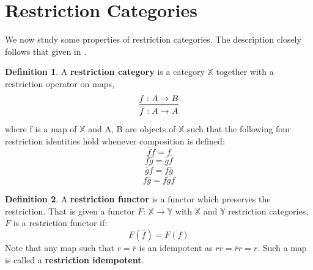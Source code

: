\documentclass[11pt, oneside]{amsart}
\theoremstyle{definition}
\newtheorem{definition}{Definition}[section]
\theoremstyle{definition}
\begin{document}
\section{Restriction Categories}
We now study some properties of restriction categories. The description closely follows that given in \cite{brett}.\\
\begin{definition}
 A \textbf{restriction category} is a category $\mathbb{X}$  together with a  restriction operator on maps,\\
\begin{equation*}
\infer{\overline{f}: A \to A} {f: A \to B} 
\end{equation*}
 where f is a map of $\mathbb{X}$ and A, B are objects of $\mathbb{X}$ such that the following four restriction identities hold whenever composition is defined:
\begin{equation*}
\overline{f}{f}=f \tag{R1}
\end{equation*}
\begin{equation*}
\overline{f}\overline{g}=\overline{g}\overline{f} \tag{R2}
\end{equation*}
\begin{equation*}
\overline{\overline{g}{f}}=\overline{f}\overline{g} \tag{R3}
\end{equation*}
\begin{equation*}
{f}\overline{g}=\overline{fg}f \tag{R4}
\end{equation*}
\end{definition}
\begin{definition}
 A \textbf{restriction functor} is a functor which preserves the restriction. That is given a functor $F$: $\mathbb{X} \to \mathbb{Y}$ with $\mathbb{X}$ and $\mathbb{Y}$ restriction categories, $F$ is a restriction functor if:\\
\begin{equation}
F(\overline{f})=\overline{F(f)}
\end{equation}
Note that any map such that $r=\overline{r}$ is an idempotent as $rr=\overline{r}r=r$. Such a map is called a \textbf{restriction idempotent}.
\end{definition}
\end{document}
